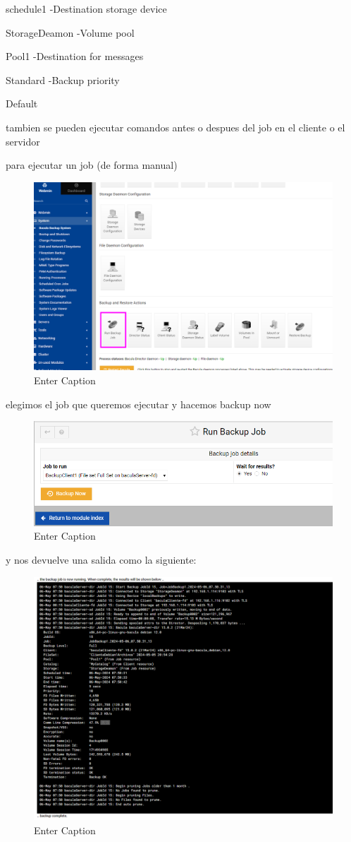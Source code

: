 schedule1
-Destination storage device

StorageDeamon
-Volume pool

Pool1
-Destination for messages

Standard
-Backup priority

  Default 
 
  
tambien se pueden ejecutar comandos antes o despues del job en el cliente o el servidor



para ejecutar un job (de forma manual)

\begin{figure}[H]
    \centering
    \includegraphics[width=0.5\linewidth]{instalacionBacula/runbackupjonbb.png}
    \caption{Enter Caption}
\end{figure}

elegimos el job que queremos ejecutar y hacemos backup now
\begin{figure}[H]
    \centering
    \includegraphics[width=0.5\linewidth]{instalacionBacula/backupnoww.png}
    \caption{Enter Caption}
\end{figure}

y nos devuelve una salida como la siguiente:
\begin{figure}[H]
    \centering
    \includegraphics[width=0.5\linewidth]{instalacionBacula/salidajob1.png}
    \caption{Enter Caption}
\end{figure}

